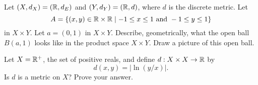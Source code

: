 {\item Let $(X, d_X) = (\mathbb{R}, d_E)$ and $(Y, d_Y) = (\mathbb{R}, d)$, where $d$ is the discrete metric. Let  
\[A=\{(x,y) \in \mathbb{R} \times \mathbb{R} \mid -1\leq x \leq 1 \text{ and } -1 \leq y \leq 1\}\]
in $X \times Y$.  Let $a = (0,1)$ in $X \times Y$. Describe, geometrically, what the open ball $B(a,1)$ looks like in the product space $X \times Y$.  Draw a picture of this open ball. %

\ea

\begin{comment}

\ExerciseSolution
		\ba
		\item  In this case we have 
\begin{align*}
d'(((1,2), (1,-1)), &((0,5),(2,-2))) = \max\{d_M((1,2), (0,5)), d_T((1,-1), (2,-2))\} \\
	&= \max\{\max\{| 1-0 |, | 2-5 |\}, | 1-2 | + | -1-(-2) |\} \\
	&= \max\{3, 1+1 \} \\
	&= 3.
\end{align*}
	
		\item  If $y \neq 1$, then $d(y,1) = 1$ and $d'((x,y), a) \geq 1$. So the points in $B(a,1)$ lie along the line $y=1$. Now
\[d'((x,1),a) = d_E(x,0) = | x |,\]
so $B(a,1)$ is the open line segment $\{(x,y) \mid -1<x<1, y=1\}$. See Figure \ref{F:Open_product}
Since $B(a,1) \subseteq A$, the point $a$ is an interior point of $A$. 
\begin{figure}[h]
\begin{center}
\resizebox{!}{2.0in}{\texttt{[image: Open\_product.pdf]}}
\caption{The open ball $B(a,1)$.} 
\label{F:Open_product}
\end{center}
\end{figure}

		\ea

\end{comment}

\item Let $X = \mathbb{R}^+$, the set of positive reals, and define $d: X \times X \to \mathbb{R}$ by 
\[d(x,y) = |\ln(y/x)|.\]
Is $d$ is a metric on $X$? Prove your answer. 

\begin{comment}

\ExerciseSolution We show that $d$ is a metric on $X$. Let $x, y \in X$. By definition we have $d(x,y) \geq 0$. Also,
\[d(x,y) = |\ln(y/x)| = |\ln(x/y)^{-1}| = |-\ln(x/y)| = |\ln(x/y)| = d(y,x).\]


\end{comment}}
